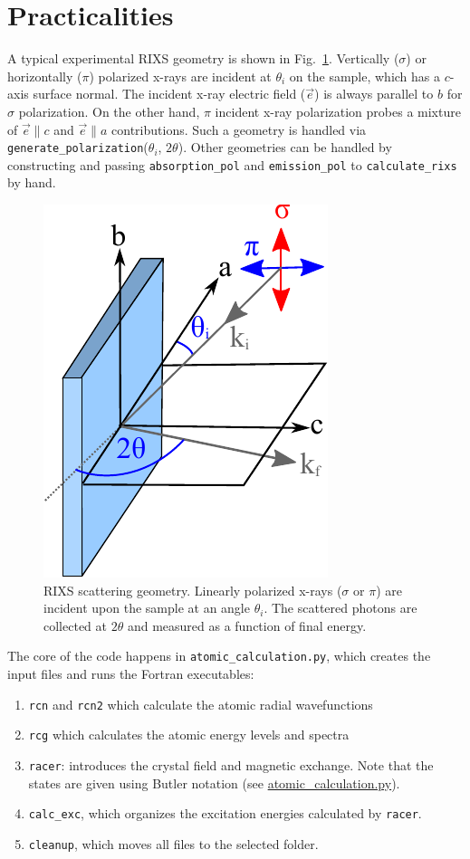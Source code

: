\documentclass[aps,onecolumn, notitlepage, longbibliography]{revtex4-1}
\begin{document}
\section{Practicalities}

A typical experimental RIXS geometry is shown in Fig.~\ref{geom}. Vertically ($\sigma$) or horizontally ($\pi$) polarized x-rays are incident at $\theta_i$ on the sample, which has a $c$-axis surface normal. The incident x-ray electric field ($\vec{e}$) is always parallel to $b$ for $\sigma$ polarization. On the other hand, $\pi$ incident x-ray polarization probes a mixture of $\vec{e} \parallel c$ and $\vec{e}\parallel a$ contributions.  Such a geometry is handled via \texttt{generate\_polarization}($\theta_i$, $2\theta$). Other geometries can be handled by constructing and passing \texttt{absorption\_pol} and \texttt{emission\_pol} to 
\texttt{calculate\_rixs} by hand.

\begin{figure}
\includegraphics[width=1.7 in]{suppl_geometry.pdf}
\caption{RIXS scattering geometry. Linearly polarized x-rays ($\sigma$ or $\pi$) are incident upon the sample at an angle $\theta _i $. The scattered photons are collected at $2\theta$ and measured as a function of final energy.}
\label{geom}
\end{figure}

The core of the code happens in \texttt{atomic\_calculation.py}, which creates the input files and runs the Fortran executables:
\begin{enumerate}
\item \texttt{rcn} and \texttt{rcn2} which calculate the atomic radial wavefunctions
\item \texttt{rcg} which calculates the atomic energy levels and spectra
\item \texttt{racer}: introduces the crystal field and magnetic exchange. Note that the
states are given using Butler notation (see \href{https://github.com/gfabbris/multiplety/blob/master/multiplety/atomic\_calculation.py}{atomic\_calculation.py}).
\item \texttt{calc\_exc}, which organizes the excitation energies calculated by \texttt{racer}.
\item \texttt{cleanup}, which moves all files to the selected folder.
\end{enumerate}
\end{document}
